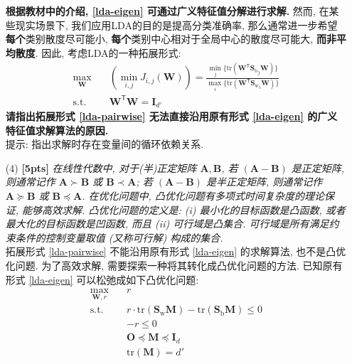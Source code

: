 \documentclass[a4paper]{article}
\numberwithin{equation}{section}
\theoremstyle{definition}
\def \transposed {\mathsf{T}}
\def \Sw {\mathbf{S}_{\mathrm{w}}}
\def \Sb {\mathbf{S}_{\mathrm{b}}}
\def \A {\mathbf{A}}
\def \B {\mathbf{B}}
\def \O {\mathbf{O}}
\def \I {\mathbf{I}}
\def \M {\mathbf{M}}
\def \W {\mathbf{W}}
\newcommand\sbr[1]{\left( #1 \right)}
\newcommand\tr[1]{\mathrm{tr}\sbr{#1}}
\begin{document}
\begin{enumerate}
	      \textbf{根据教材中的介绍, \eqref{lda-eigen} 可通过广义特征值分解进行求解.} 然而, 在某些现实场景下, 我们应用LDA的目的是提高分类准确率, 那么通常进一步希望\textbf{每个}类别散度尽可能小, \textbf{每个}类别中心相对于全局中心的散度尽可能大, \textbf{而非平均散度}. 因此, 考虑LDA的一种拓展形式:
	      \begin{equation}
		      \begin{aligned}
			      \max_{\W} \quad     & \sbr{\min_{i,j} J_{i,j}(\W)} = \frac{\min_{j} \{ \tr{\W^\transposed {\Sb}_j \W} \}}{\max_{i} \{ \tr{\W^\transposed {\Sw}_i \W} \}} \\
			      \mathrm{s.t.} \quad & \W^\transposed \W = \I_{d'}
		      \end{aligned}
		      \label{lda-pairwise}
	      \end{equation}
	      \textbf{请指出拓展形式 \eqref{lda-pairwise} 无法直接沿用原有形式 \eqref{lda-eigen} 的广义特征值求解算法的原因.} \\
	      提示: 指出求解时存在变量间的循环依赖关系.
	\item[(4)] \textbf{[5pts]} \textit{在线性代数中, 对于(半)正定矩阵 $\A, \B$, 若 $\sbr{\A-\B}$ 是正定矩阵, 则通常记作 $\A \succ \B$ 或 $\B \prec \A$; 若 $\sbr{\A-\B}$ 是半正定矩阵, 则通常记作 $\A \succcurlyeq \B$ 或 $\B \preccurlyeq \A$. 在优化问题中, 凸优化问题有多项式时间复杂度的理论保证, 能够高效求解. 凸优化问题的定义是: (i) 最小化的目标函数是凸函数, 或者最大化的目标函数是凹函数, 而且 (ii) 可行域是凸集合. 可行域是所有满足约束条件的控制变量取值 (又称可行解) 构成的集合.} \\
	      拓展形式 \eqref{lda-pairwise} 不能沿用原有形式 \eqref{lda-eigen} 的求解算法, 也不是凸优化问题. 为了高效求解, 需要探索一种将其转化成凸优化问题的方法. 已知原有形式 \eqref{lda-eigen} 可以松弛成如下凸优化问题:
	      \begin{equation}
		      \begin{aligned}
			      \max_{\W,r} \quad   & r                                             \\
			      \mathrm{s.t.} \quad & r \cdot \tr{\Sw \M} - \tr{\Sb \M} \leqslant 0 \\
			      \quad               & -r \leqslant 0                                \\
			      \quad               & \O \preccurlyeq \M \preccurlyeq \I_{d}       \\
			      \quad               & \tr{\M} = d'                                  \\
		      \end{aligned}

\end{equation}
\end{enumerate}
\end{document}
